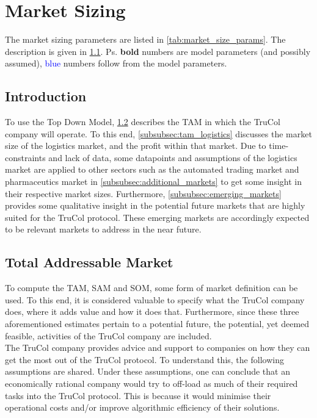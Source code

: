 
\section{Market Sizing}\label{sec:markets}

The market sizing parameters are listed in \cref{tab:market_size_params}. The description is given in \cref{subsec:market_introduction}. Ps. \textbf{bold} numbers are model parameters (and possibly assumed), \textcolor{blue}{blue} numbers follow from the model parameters. %

\ifx\homepath\overleafhome
\else
\fi

\subsection{Introduction}\label{subsec:market_introduction}
To use the Top Down Model, \cref{subsec:total_addressable_market} describes the TAM in which the TruCol company will operate. To this end, \cref{subsubsec:tam_logistics} discusses the market size of the logistics market, and the profit within that market. Due to time-constraints and lack of data, some datapoints and assumptions of the logistics market are applied to other sectors such as the automated trading market and pharmaceutics market in \cref{subsubsec:additional_markets} to get some insight in their respective market sizes. Furthermore, \cref{subsubsec:emerging_markets} provides some qualitative insight in the potential future markets that are highly suited for the TruCol protocol. These emerging markets are accordingly expected to be relevant markets to address in the near future.

\subsection{Total Addressable Market}\label{subsec:total_addressable_market}
To compute the TAM, SAM and SOM, some form of market definition can be used. To this end, it is considered valuable to specify what the TruCol company does, where it adds value and how it does that. Furthermore, since these three aforementioned estimates pertain to a potential future, the potential, yet deemed feasible, activities of the TruCol company are included.
\\
The TruCol company provides advice and support to companies on how they can get the most out of the TruCol protocol. To understand this, the following assumptions are shared. Under these assumptions, one can conclude that an economically rational company would try to off-load as much of their required tasks into the TruCol protocol. This is because it would minimise their operational costs and/or improve algorithmic efficiency of their solutions.

